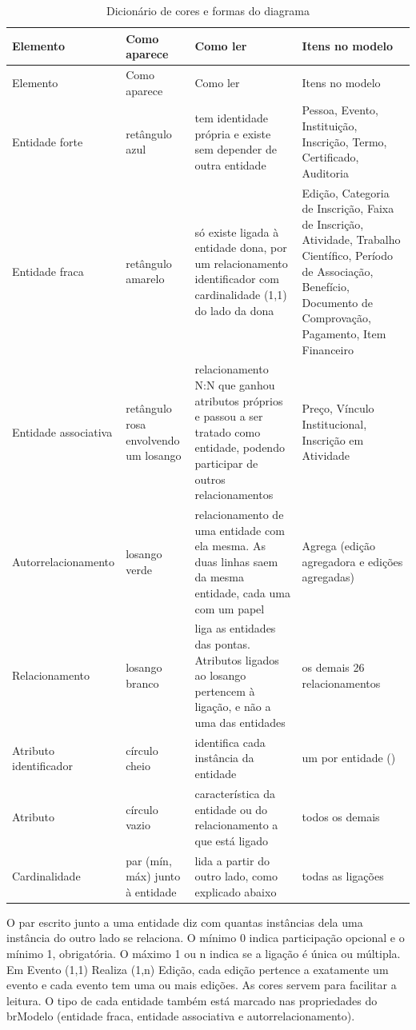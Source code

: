 {\small
\begin{longtable}{@{}L{3.2cm} L{2.5cm} L{4.3cm} L{3.5cm}@{}}
\caption{Dicionário de cores e formas do diagrama}\label{tab:cores}\\
\toprule
Elemento & Como aparece & Como ler & Itens no modelo\\
\midrule
\endfirsthead
\toprule
Elemento & Como aparece & Como ler & Itens no modelo\\
\midrule
\endhead
\bottomrule
\endfoot
Entidade forte & retângulo azul & tem identidade própria e existe sem depender de outra entidade & Pessoa, Evento, Instituição, Inscrição, Termo, Certificado, Auditoria\\
Entidade fraca & retângulo amarelo & só existe ligada à entidade dona, por um relacionamento identificador com cardinalidade (1,1) do lado da dona & Edição, Categoria de Inscrição, Faixa de Inscrição, Atividade, Trabalho Científico, Período de Associação, Benefício, Documento de Comprovação, Pagamento, Item Financeiro\\
Entidade associativa & retângulo rosa envolvendo um losango & relacionamento N:N que ganhou atributos próprios e passou a ser tratado como entidade, podendo participar de outros relacionamentos & Preço, Vínculo Institucional, Inscrição em Atividade\\
Autorrelacionamento & losango verde & relacionamento de uma entidade com ela mesma. As duas linhas saem da mesma entidade, cada uma com um papel & Agrega (edição agregadora e edições agregadas)\\
Relacionamento & losango branco & liga as entidades das pontas. Atributos ligados ao losango pertencem à ligação, e não a uma das entidades & os demais 26 relacionamentos\\
Atributo identificador & círculo cheio & identifica cada instância da entidade & um por entidade ()\\
Atributo & círculo vazio & característica da entidade ou do relacionamento a que está ligado & todos os demais\\
Cardinalidade & par (mín, máx) junto à entidade & lida a partir do outro lado, como explicado abaixo & todas as ligações\\
\end{longtable}
}

O par escrito junto a uma entidade diz com quantas instâncias dela uma instância do outro lado se relaciona. O mínimo 0 indica participação opcional e o mínimo 1, obrigatória. O máximo 1 ou n indica se a ligação é única ou múltipla. Em Evento (1,1) Realiza (1,n) Edição, cada edição pertence a exatamente um evento e cada evento tem uma ou mais edições. As cores servem para facilitar a leitura. O tipo de cada entidade também está marcado nas propriedades do brModelo (entidade fraca, entidade associativa e autorrelacionamento).

